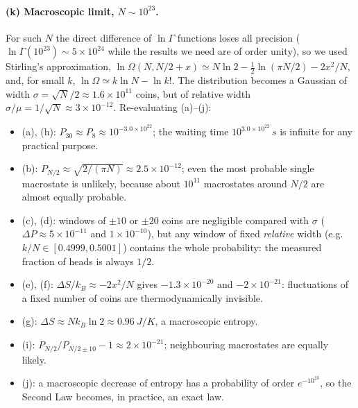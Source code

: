 \paragraph{(k) Macroscopic limit, $N\sim10^{23}$.}
For such $N$ the direct difference of $\ln\Gamma$ functions loses all
precision ($\ln\Gamma(10^{23})\sim5\times10^{24}$ while the results we need
are of order unity), so we used Stirling's approximation,
$\ln\Omega(N,N/2+x)\simeq N\ln2-\tfrac12\ln(\pi N/2)-2x^{2}/N$, and, for small
$k$, $\ln\Omega\simeq k\ln N-\ln k!$. The distribution becomes a Gaussian of
width $\sigma=\sqrt N/2\approx1.6\times10^{11}$ coins, but of relative width
$\sigma/\mu=1/\sqrt N\approx3\times10^{-12}$. Re-evaluating (a)--(j):
\begin{itemize}
  \item (a), (h): $P_{30}\approx P_8\approx10^{-3.0\times10^{22}}$; the waiting
        time $10^{3.0\times10^{22}}\,\si{s}$ is infinite for any practical purpose.
  \item (b): $P_{N/2}\approx\sqrt{2/(\pi N)}\approx2.5\times10^{-12}$; even the most
        probable single macrostate is unlikely, because about $10^{11}$
        macrostates around $N/2$ are almost equally probable.
  \item (c), (d): windows of $\pm10$ or $\pm20$ coins are negligible compared with
        $\sigma$ ($\Delta P\approx5\times10^{-11}$ and $1\times10^{-10}$), but any
        window of fixed \emph{relative} width (e.g.\ $k/N\in[0.4999,0.5001]$)
        contains the whole probability: the measured fraction of heads is
        always $1/2$.
  \item (e), (f): $\Delta S/k_B\approx-2x^{2}/N$ gives $-1.3\times10^{-20}$ and
        $-2\times10^{-21}$: fluctuations of a fixed number of coins are
        thermodynamically invisible.
  \item (g): $\Delta S\approx N k_B\ln2\approx\SI{0.96}{J/K}$, a macroscopic entropy.
  \item (i): $P_{N/2}/P_{N/2\pm10}-1\approx2\times10^{-21}$; neighbouring
        macrostates are equally likely.
  \item (j): a macroscopic decrease of entropy has a probability of order
        $e^{-10^{23}}$, so the Second Law becomes, in practice, an exact law.
\end{itemize}
